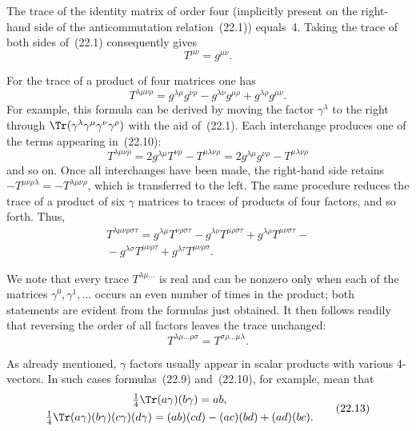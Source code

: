 The trace of the identity matrix of order four (implicitly present on the right-hand side of the anticommutation relation~(22.1)) equals~4. Taking the trace of both sides of~(22.1) consequently gives
\begin{equation}
T^{\mu\nu} = g^{\mu\nu}.
\tag{22.9}
\end{equation}

For the trace of a product of four matrices one has
\begin{equation}
T^{\lambda\mu\nu\rho} = g^{\lambda\mu}g^{\nu\rho} - g^{\lambda\nu}g^{\mu\rho} + g^{\lambda\rho}g^{\mu\nu}.
\tag{22.10}
\end{equation}
For example, this formula can be derived by moving the factor $\gamma^\lambda$ to the right through $\Tr(\gamma^\lambda\gamma^\mu\gamma^\nu\gamma^\rho)$ with the aid of~(22.1). Each interchange produces one of the terms appearing in~(22.10):
\[
T^{\lambda\mu\nu\rho}=2g^{\lambda\mu}T^{\nu\rho}-T^{\mu\lambda\nu\rho}
=2g^{\lambda\mu}g^{\nu\rho}-T^{\mu\lambda\nu\rho}
\]
and so on. Once all interchanges have been made, the right-hand side retains $-T^{\mu\nu\rho\lambda}=-T^{\lambda\mu\nu\rho}$, which is transferred to the left. The same procedure reduces the trace of a product of six $\gamma$ matrices to traces of products of four factors, and so forth. Thus,
\begin{multline}
T^{\lambda\mu\nu\rho\sigma\tau} = g^{\lambda\mu}T^{\nu\rho\sigma\tau} - g^{\lambda\nu}T^{\mu\rho\sigma\tau} + g^{\lambda\rho}T^{\mu\nu\sigma\tau} -{}\\
{}- g^{\lambda\sigma}T^{\mu\nu\rho\tau} + g^{\lambda\tau}T^{\mu\nu\rho\sigma}.
\tag{22.11}
\end{multline}

We note that every trace $T^{\lambda\mu\ldots}$ is real and can be nonzero only when each of the matrices $\gamma^0, \gamma^1, \ldots$
occurs an even number of times in the product; both statements are evident from the formulas just obtained. It then follows readily that reversing the order of all factors leaves the trace unchanged:
\begin{equation}
T^{\lambda\mu\ldots\rho\sigma} = T^{\sigma\rho\ldots\mu\lambda}.
\tag{22.12}
\end{equation}

As already mentioned, $\gamma$ factors usually appear in scalar products with various 4-vectors. In such cases formulas~(22.9) and~(22.10), for example, mean that
\begin{equation}
\begin{gathered}
\tfrac{1}{4}\Tr(a\gamma)(b\gamma) = ab,\\
\tfrac{1}{4}\Tr(a\gamma)(b\gamma)(c\gamma)(d\gamma) = (ab)(cd) - (ac)(bd) + (ad)(bc).
\end{gathered}
\tag{22.13}
\end{equation}

